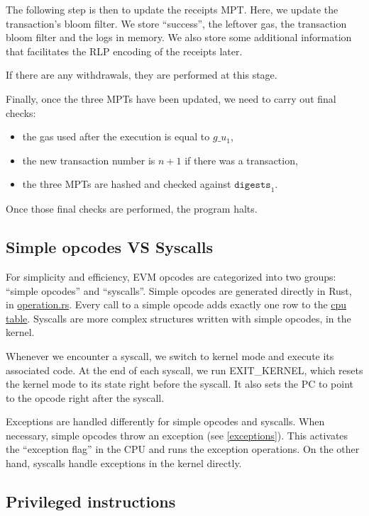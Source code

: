 The following step is then to update the receipts MPT. Here, we update the transaction's bloom filter. We store ``success'', the leftover gas, the transaction bloom filter and the logs in memory. We also store some additional information that facilitates the RLP encoding of the receipts later.

If there are any withdrawals, they are performed at this stage.

Finally, once the three MPTs have been updated, we need to carry out final checks:
\begin{itemize}
    \item the gas used after the execution is equal to $g\_u_1$,
    \item the new transaction number is $n+1$ if there was a transaction,
    \item the three MPTs are hashed and checked against $\texttt{digests}_1$.
\end{itemize}
Once those final checks are performed, the program halts.

\subsection{Simple opcodes VS Syscalls}
For simplicity and efficiency, EVM opcodes are categorized into two groups: ``simple opcodes'' and ``syscalls''. Simple opcodes are generated directly in Rust, in \href{https://github.com/0xPolygonZero/plonky2/blob/main/evm/src/witness/operation.rs}{operation.rs}. Every call to a simple opcode adds exactly one row to the \href{https://github.com/0xPolygonZero/plonky2/blob/main/evm/spec/tables/cpu.tex}{cpu table}. Syscalls are more complex structures written with simple opcodes, in the kernel.

Whenever we encounter a syscall, we switch to kernel mode and execute its associated code. At the end of each syscall, we run EXIT\_KERNEL, which resets the kernel mode to its state right before the syscall. It also sets the PC to point to the opcode right after the syscall.

Exceptions are handled differently for simple opcodes and syscalls. When necessary, simple opcodes throw an exception (see \ref{exceptions}). This activates the ``exception flag'' in the CPU and runs the exception operations. On the other hand, syscalls handle exceptions in the kernel directly.

\subsection{Privileged instructions}

